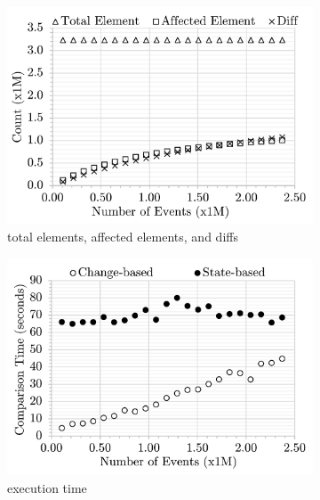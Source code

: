 \begin{figure}
    \vspace{-26pt}
    \begin{subfigure}[t]{0.33\linewidth}
    \includegraphics[width=\linewidth]{mixed-count-events}
    \caption{total elements, affected elements, and diffs}
    \label{fig:modification_course}
    \end{subfigure}
    \begin{subfigure}[t]{0.33\linewidth}
        \includegraphics[width=\linewidth]{mixed-time-events}
        \caption{execution time}
        \label{fig:time_diffs}
    \end{subfigure}
    \begin{subfigure}[t]{0.33\linewidth}

\end{subfigure}
\end{figure}
